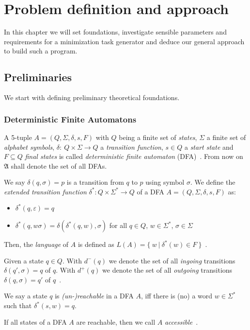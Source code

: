 
\chapter{Problem definition and approach} \label{ch:2}

In this chapter we will set foundations, investigate sensible parameters and requirements for a minimization task generator and deduce our general approach to build such a program.

\section{Preliminaries}

We start with defining preliminary theoretical foundations.

\subsection{Deterministic Finite Automatons}

A 5-tuple $A = (Q, \Sigma, \delta, s, F)$ with $Q$ being a finite set of \emph{states}, $\Sigma$ a finite set of \emph{alphabet symbols}, $\delta \colon\ Q \times \Sigma \to Q$ a \emph{transition function}, $s \in Q$ a \emph{start state} and $F \subseteq Q$ \emph{final states} is called \emph{deterministic finite automaton} (DFA)~\cite[p. 46]{HMU01}. From now on $\mathfrak{A}$ shall denote the set of all DFAs.

We say $\delta(q,\sigma) = p$ is a transition from $q$ to $p$ using symbol $\sigma$. We define the \emph{extended transition function} $\delta^* : Q \times \Sigma^* \to Q$ of a DFA $A = (Q, \Sigma, \delta, s, F)$ as:
\begin{itemize}
	\item $\delta^*(q,\varepsilon) = q$
	\item $\delta^*(q,w\sigma) = \delta(\delta^*(q,w),\sigma)$ for all $q \in Q$, $w \in \Sigma^*$, $\sigma \in \Sigma$
\end{itemize}
Then, the \emph{language} of $A$ is defined as $L(A) = \{\ w\ |\ \delta^*(w) \in F\ \}$~\cite[pp. 49-50. 52]{HMU01}.

Given a state $q \in Q$. With $d^-(q)$ we denote the set of all \emph{ingoing} transitions $\delta(q', \sigma) = q$ of $q$. With $d^+(q)$ we denote the set of all \emph{outgoing} transitions $\delta(q, \sigma) = q'$ of $q$~\cite[pp. 2-3]{CP05}.

\begin{definition}\label{ch:1:unreachable-states}
	We say a state $q$ is \emph{(un-)reachable} in a DFA $A$, iff there is (no) a word $w \in \Sigma^*$ such that $\delta^*(s, w) = q$.
\end{definition}
\noindent If all states of a DFA $A$ are reachable, then we call $A$ \emph{accessible}~\cite[p. 2]{CP05}.

